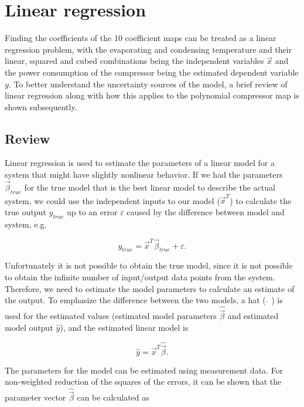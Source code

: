 \section{Linear regression}
\label{sec:linear_regression}
Finding the coefficients of the 10 coefficient maps can be treated as a linear regression problem, with the evaporating and condensing temperature and their linear, squared and cubed combinations being the independent variables ${\vec x}$ and the power consumption of the compressor being the estimated dependent variable $y$. To better understand the uncertainty sources of the model, a brief review of linear regression along with how this applies to the polynomial compressor map is shown subsequently.

\subsection{Review}
\label{sec:linreg_review}
Linear regression is used to estimate the parameters of a linear model for a system that might have slightly nonlinear behavior.  If we had the parameters ${\vec \beta _{true}} $ for the true model that is the best linear model to describe the actual system, we could use the independent inputs to our model (${\vec x^T}$) to calculate the true output $y_{true}$ up to an error $\varepsilon$ caused by the difference between model and system, e.g.

\begin{equation}
{y_{true}} = {\vec x^T}{\vec \beta _{true}} + \varepsilon.
\label{eq:true_lin_model}
\end{equation}

Unfortunately it is not possible to obtain the true model, since it is not possible to obtain the infinite number of input/output data points from the system. Therefore, we need to estimate the model parameters to calculate an estimate of the output. To emphasize the difference between the two models, a hat ( $\hat{}$ ) is used for the estimated values (estimated model parameters $\hat {\vec \beta}$ and estimated model output $\hat y$), and the estimated linear model is

\begin{equation}
\hat y = {\vec x^T}\hat {\vec \beta}.
\label{eq:estimted_lin_model}
\end{equation}

The parameters for the model can be estimated using measurement data. For non-weighted reduction of the squares of the errors, it can be shown that the  parameter vector $\hat {\vec \beta}$ can be calculated as

